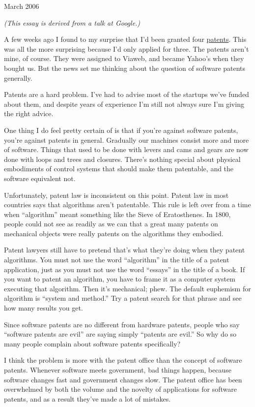 March 2006

\emph{(This essay is derived from a talk at Google.)}

A few weeks ago I found to my surprise that I'd been granted four
\href{http://paulgraham.infogami.com/blog/morepatents}{patents}. This
was all the more surprising because I'd only applied for three. The
patents aren't mine, of course. They were assigned to Viaweb, and became
Yahoo's when they bought us. But the news set me thinking about the
question of software patents generally.

Patents are a hard problem. I've had to advise most of the startups
we've funded about them, and despite years of experience I'm still not
always sure I'm giving the right advice.

One thing I do feel pretty certain of is that if you're against software
patents, you're against patents in general. Gradually our machines
consist more and more of software. Things that used to be done with
levers and cams and gears are now done with loops and trees and
closures. There's nothing special about physical embodiments of control
systems that should make them patentable, and the software equivalent
not.

Unfortunately, patent law is inconsistent on this point. Patent law in
most countries says that algorithms aren't patentable. This rule is left
over from a time when ``algorithm'' meant something like the Sieve of
Eratosthenes. In 1800, people could not see as readily as we can that a
great many patents on mechanical objects were really patents on the
algorithms they embodied.

Patent lawyers still have to pretend that's what they're doing when they
patent algorithms. You must not use the word ``algorithm'' in the title
of a patent application, just as you must not use the word ``essays'' in
the title of a book. If you want to patent an algorithm, you have to
frame it as a computer system executing that algorithm. Then it's
mechanical; phew. The default euphemism for algorithm is ``system and
method.'' Try a patent search for that phrase and see how many results
you get.

Since software patents are no different from hardware patents, people
who say ``software patents are evil'' are saying simply ``patents are
evil.'' So why do so many people complain about software patents
specifically?

I think the problem is more with the patent office than the concept of
software patents. Whenever software meets government, bad things happen,
because software changes fast and government changes slow. The patent
office has been overwhelmed by both the volume and the novelty of
applications for software patents, and as a result they've made a lot of
mistakes.

